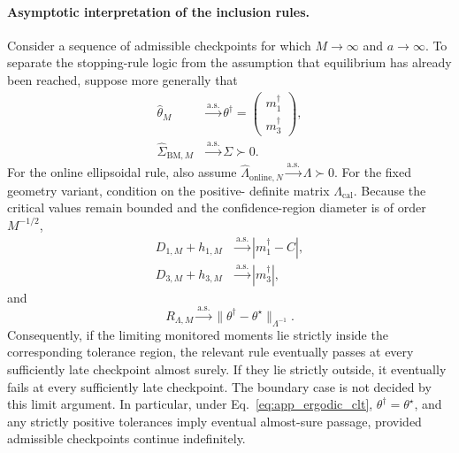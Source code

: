 \documentclass[showpacs,amsmath,amssymb,twocolumn,prx,superscriptaddress,10pt,aps,nofootinbib]{revtex4-2}
\begin{document}
\paragraph{Asymptotic interpretation of the inclusion rules.}
Consider a sequence of admissible checkpoints for which $M\to\infty$ and $a\to\infty$. To separate the stopping-rule logic from the assumption that equilibrium has already been reached, suppose more generally that
\begin{equation}
\label{eq:app_generic_limits}
\begin{aligned}
    \widehat\theta_M
    &\xrightarrow{\mathrm{a.s.}}
    \theta^\dagger
    =
    \begin{pmatrix}
        m_1^\dagger\\
        m_3^\dagger
    \end{pmatrix},\\
    \widehat\Sigma_{\mathrm{BM},M}
    &\xrightarrow{\mathrm{a.s.}}
    \Sigma\succ0.
\end{aligned}
\end{equation}
For the online ellipsoidal rule, also assume
$\widehat\Lambda_{\mathrm{online},N} \xrightarrow{\mathrm{a.s.}}\Lambda\succ0$. For the fixed geometry variant, condition on the positive- definite matrix $\Lambda_{\mathrm{cal}}$. Because the critical values remain bounded and the confidence-region diameter is of order $M^{-1/2}$,
\begin{equation}
\label{eq:app_ruleI_limits}
\begin{aligned}
    D_{1,M}+h_{1,M}
    &\xrightarrow{\mathrm{a.s.}}
    |m_1^\dagger-C|,\\
    D_{3,M}+h_{3,M}
    &\xrightarrow{\mathrm{a.s.}}
    |m_3^\dagger|,
\end{aligned}
\end{equation}
and
\begin{equation}
\label{eq:app_ruleII_limit}
    R_{\Lambda,M}
    \xrightarrow{\mathrm{a.s.}}
    \|\theta^\dagger-\theta^\star\|_{\Lambda^{-1}}.
\end{equation}
Consequently, if the limiting monitored moments lie strictly inside the corresponding tolerance region, the relevant rule eventually passes at every sufficiently late checkpoint almost surely. If they lie strictly outside, it eventually fails at every sufficiently late checkpoint. The boundary case is not decided by this limit argument. In particular, under Eq.~\eqref{eq:app_ergodic_clt}, $\theta^\dagger=\theta^\star$, and any strictly positive tolerances imply eventual almost-sure passage, provided admissible checkpoints continue
indefinitely.
\end{document}
